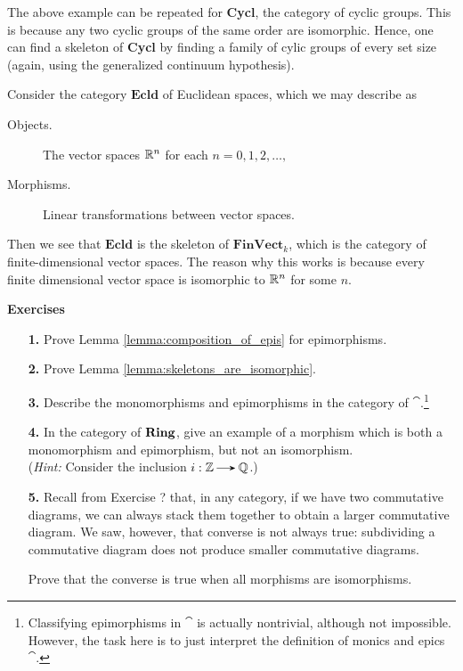    The above example can be repeated for \textbf{Cycl}, the category of cyclic groups.
    This is because any two cyclic groups of the same order are isomorphic. Hence, one 
    can find a skeleton of \textbf{Cycl} by finding a family of cylic groups of every set 
    size (again, using the generalized continuum hypothesis).  

    \begin{example}
        Consider the category $\textbf{Ecld}$ of Euclidean spaces, which we may
        describe as 
        \begin{description}
            \item[Objects.] The vector spaces $\mathbb{R}^n$ for each $n = 0, 1, 2, \dots, $
            \item[Morphisms.] Linear transformations between vector spaces. 
        \end{description}
        Then we see that $\textbf{Ecld}$ is the skeleton of $\textbf{FinVect}_k$, 
        which is the category of finite-dimensional vector spaces. The reason why this 
        works is because every finite dimensional vector space is isomorphic to $\mathbb{R}^n$ for 
        some $n$. 
    \end{example}

    {\large \textbf{Exercises}
    \vspace{0.5cm}}
    \begin{itemize}
        \item[\textbf{1.}] Prove Lemma \ref{lemma:composition_of_epis} for epimorphisms.

        \item[\textbf{2.}] Prove Lemma \ref{lemma:skeletons_are_isomorphic}.
        \item[\textbf{3.}] Describe the monomorphisms and epimorphisms 
        in the category of $\cat$.\footnote{Classifying epimorphisms 
        in $\cat$ is actually nontrivial, although not impossible. 
        However, the task here is to just interpret 
        the definition of monics and epics $\cat$. }

        \item[\textbf{4.}]
        In the category of $\operatorname{\mathbf{Ring}}$, give an example of a morphism 
        which is both a monomorphism and epimorphism, but not an isomorphism.
        \\
        (\emph{Hint:} Consider the inclusion $i: \zz \to \qq$.)

        \item[\textbf{5.}]
        Recall from Exercise ? that, in any category, if we have two commutative 
        diagrams, we can always stack them together to obtain a larger commutative diagram. 
        We saw, however, that converse is not always true: subdividing a commutative 
        diagram does not produce smaller commutative diagrams. 
        
        Prove that the converse is true when all morphisms are isomorphisms.     
    \end{itemize}


